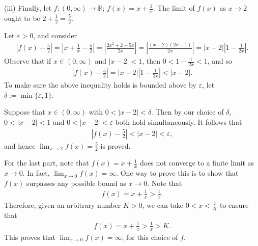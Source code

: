 \documentclass[letterpaper,10pt,english]{jupyterBook}
\begin{document}
\label{\detokenize{Solutions-full:iiisol}}
\sphinxAtStartPar
(iii) Finally, let \(f:(0,\infty)\to\mathbb{R}\); \(f(x)=x+\frac{1}{x}\). The limit of \(f(x)\) as \(x\rightarrow 2\) ought to be \(2+\frac{1}{2}=\frac{5}{2}\).

\sphinxAtStartPar
Let \(\varepsilon>0\), and consider
\begin{equation*}
\begin{split}
\left|f(x)-\frac{5}{2}\right| = \left|x+\frac{1}{x}-\frac{5}{2}\right| = \left|\frac{2x^2+2-5x}{2x}\right| = \left|\frac{(x-2)(2x-1)}{2x}\right| = |x-2|\left|1-\frac{1}{2x}\right|.
\end{split}
\end{equation*}
\sphinxAtStartPar
Observe that if \(x\in(0,\infty)\) and \(|x-2|<1\), then \(0<1-\frac{1}{2x}<1\), and so
\begin{equation*}
\begin{split}
\left|f(x)-\frac{5}{2}\right| = |x-2|\left|1-\frac{1}{2x}\right| < |x-2|.
\end{split}
\end{equation*}
\sphinxAtStartPar
To make sure the above inequality holds  is bounded above by \(\varepsilon\), let \(\delta:=\min\{\varepsilon,1\}\).

\sphinxAtStartPar
Suppose that \(x\in(0,\infty)\) with \(0<|x-2|<\delta\). Then by our choice of \(\delta\), \(0<|x-2|<1\) and \(0<|x-2|<\varepsilon\) both hold simultaneously. It follows that
\begin{equation*}
\begin{split}
\left|f(x)-\frac{5}{2}\right|<|x-2|<\varepsilon,
\end{split}
\end{equation*}
\sphinxAtStartPar
and hence \(\lim_{x\rightarrow 2}f(x)=\frac{5}{2}\) is proved.

\sphinxAtStartPar
For the last part, note that \(f(x)=x+\frac{1}{x}\) does not converge to a finite limit as \(x\rightarrow 0\). In fact, \(\lim_{x\rightarrow 0}f(x)=\infty\). One way to prove this is to show that \(f(x)\) surpasses any possible bound as \(x\rightarrow 0\). Note that
\begin{equation*}
\begin{split}
f(x) = x+\frac{1}{x} > \frac{1}{x}.
\end{split}
\end{equation*}
\sphinxAtStartPar
Therefore, given an arbitrary number \(K>0\), we can take \(0<x<\frac{1}{K}\) to ensure that
\begin{equation*}
\begin{split}
f(x) = x+\frac{1}{x} > \frac{1}{x} > K.
\end{split}
\end{equation*}
\sphinxAtStartPar
This proves that \(\lim_{x\rightarrow 0} f(x) = \infty\), for this choice of \(f\).
\end{document}
